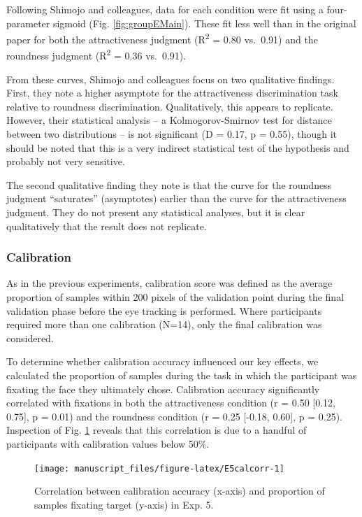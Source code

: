 \documentclass[
  man,floatsintext]{apa6}
\begin{document}
Following Shimojo and colleagues, data for each condition were fit using a four-parameter sigmoid (Fig. \ref{fig:groupEMain}). These fit less well than in the original paper for both the attractiveness judgment (R\textsuperscript{2} = 0.80 vs.~0.91) and the roundness judgment (R\textsuperscript{2} = 0.36 vs.~0.91).

From these curves, Shimojo and colleagues focus on two qualitative findings. First, they note a higher asymptote for the attractiveness discrimination task relative to roundness discrimination. Qualitatively, this appears to replicate. However, their statistical analysis -- a Kolmogorov-Smirnov test for distance between two distributions -- is not significant (D = 0.17, p = 0.55), though it should be noted that this is a very indirect statistical test of the hypothesis and probably not very sensitive.

The second qualitative finding they note is that the curve for the roundness judgment ``saturates'' (asymptotes) earlier than the curve for the attractiveness judgment. They do not present any statistical analyses, but it is clear qualitatively that the result does not replicate.

\subsubsection{Calibration}\label{calibration-5}

As in the previous experiments, calibration score was defined as the average proportion of samples within 200 pixels of the validation point during the final validation phase before the eye tracking is performed. Where participants required more than one calibration (N=14), only the final calibration was considered.

To determine whether calibration accuracy influenced our key effects, we calculated the proportion of samples during the task in which the participant was fixating the face they ultimately chose. Calibration accuracy significantly correlated with fixations in both the attractiveness condition (r = 0.50 {[}0.12, 0.75{]}, p = 0.01) and the roundness condition (r = 0.25 {[}-0.18, 0.60{]}, p = 0.25). Inspection of Fig. \ref{fig:E5calcorr} reveals that this correlation is due to a handful of participants with calibration values below 50\%.



\begin{figure}
\texttt{[image: manuscript\_files/figure-latex/E5calcorr-1]} \caption{Correlation between calibration accuracy (x-axis) and proportion of samples fixating target (y-axis) in Exp. 5.}\label{fig:E5calcorr}
\end{figure}
\end{document}
